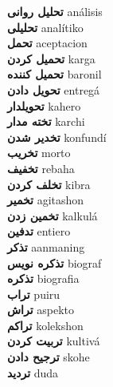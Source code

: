 \textbf{ تحلیل روانی  } análisis \\
\textbf{ تحلیلی  } analítiko \\
\textbf{ تحمل  } aceptacion \\
\textbf{ تحمیل کردن  } karga \\
\textbf{ تحمیل کننده  } baronil \\
\textbf{ تحویل دادن  } entregá \\
\textbf{ تحویلدار  } kahero \\
\textbf{ تخته مدار  } karchi \\
\textbf{ تخدیر شدن  } konfundí \\
\textbf{ تخریب  } morto \\
\textbf{ تخفیف  } rebaha \\
\textbf{ تخلف کردن  } kibra \\
\textbf{ تخمیر  } agitashon \\
\textbf{ تخمین زدن  } kalkulá \\
\textbf{ تدفین  } entiero \\
\textbf{ تذکر  } aanmaning \\
\textbf{ تذکره نویس  } biograf \\
\textbf{ تذکره  } biografia \\
\textbf{ تراب  } puiru \\
\textbf{ تراش  } aspekto \\
\textbf{ تراکم  } kolekshon \\
\textbf{ تربیت کردن  } kultivá \\
\textbf{ ترجیح دادن  } skohe \\
\textbf{ تردید  } duda \\
